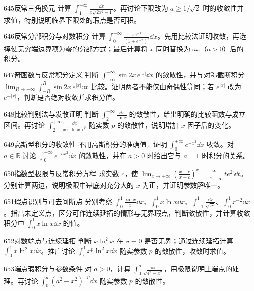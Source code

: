 \begin{exercise}{645}{反常三角换元}
计算 $\int_1^{+\infty}\frac{\dd x}{x\sqrt{2x^2-1}}$。再讨论下限改为 $a\ge1/\sqrt2$ 时的收敛性并求值，特别说明临界下限处的瑕点是否可积。
\end{exercise}
\begin{exercise}{646}{反常分部积分与对数积分}
计算 $\int_0^{+\infty}\frac{xe^{-x}}{(1+e^{-x})^2}\dd x$。先用比较法证明收敛，再选择使无穷端边界项为零的分部方式；最后计算将 $x$ 同时替换为 $ax$（$a>0$）后的积分。
\end{exercise}
\begin{exercise}{647}{奇函数与反常积分定义}
判断 $\int_{-\infty}^{+\infty}\sin2x\,e^{|x|}\dd x$ 的敛散性，并与对称截断积分 $\lim_{R\to+\infty}\int_{-R}^R\sin2x\,e^{|x|}\dd x$ 比较。证明两者不能仅由奇偶性等同；若 $e^{|x|}$ 改为 $e^{-|x|}$，判断是否绝对收敛并求积分值。
\end{exercise}
\begin{exercise}{648}{比较判别法与发散证明}
判断 $\int_2^{+\infty}\frac{\dd x}{\ln x}$ 的敛散性，给出明确的比较函数与成立区间。再讨论 $\int_2^{+\infty}\frac{\dd x}{x(\ln x)^p}$ 随实数 $p$ 的敛散性，说明增加 $x$ 因子后的变化。
\end{exercise}
\begin{exercise}{649}{高斯型积分的收敛性}
不用高斯积分的准确值，证明 $\int_0^{+\infty}e^{-x^2}\dd x$ 收敛。对 $a\in\mathbb R$ 讨论 $\int_0^{+\infty}e^{-ax^2}\dd x$ 的敛散性，并在 $a>0$ 时给出它与 $a=1$ 时积分的关系。
\end{exercise}
\begin{exercise}{650}{指数型极限与反常积分方程}
求实数 $c$，使 $\lim_{x\to+\infty}\left(\frac{x+c}{x-c}\right)^x=\int_{-\infty}^cte^{2t}\dd t$。分别计算两边，说明极限中幂底对充分大的 $x$ 为正，并证明参数解唯一。
\end{exercise}
\begin{exercise}{651}{瑕点识别与可去间断点}
分别考察 $\int_0^1\frac{\sin x}{x}\dd x$、$\int_0^1x\ln x\dd x$、$\int_{-1}^1\frac{\dd x}{\sqrt{x^2}}$、$\int_0^1x^{-2}\dd x$。指出未定义点，区分可作连续延拓的情形与无界瑕点，判断敛散性，并计算收敛积分中 $\int_0^1x\ln x\dd x$ 的值。
\end{exercise}
\begin{exercise}{652}{对数端点与连续延拓}
判断 $x\ln^2x$ 在 $x=0$ 是否无界；通过连续延拓计算 $\int_0^1x\ln^2x\dd x$。推广讨论 $\int_0^1x^p\ln^2x\dd x$ 随实参数 $p$ 的敛散性，收敛时求值。
\end{exercise}
\begin{exercise}{653}{端点瑕积分与参数条件}
对 $a>0$，计算 $\int_0^a\frac{\dd x}{\sqrt{a^2-x^2}}$，用极限说明上端点的处理。再讨论 $\int_0^a(a^2-x^2)^{-p}\dd x$ 随实参数 $p$ 的敛散性。
\end{exercise}
